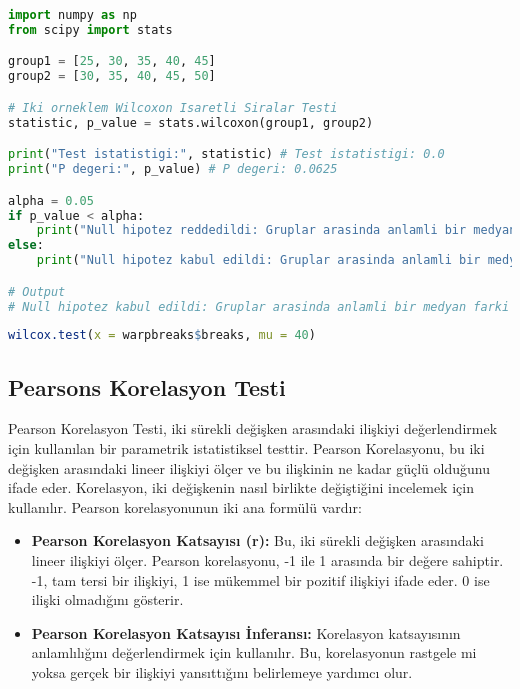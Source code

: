 \begin{lstlisting}[language=Python]
import numpy as np
from scipy import stats

group1 = [25, 30, 35, 40, 45]
group2 = [30, 35, 40, 45, 50]

# Iki orneklem Wilcoxon Isaretli Siralar Testi
statistic, p_value = stats.wilcoxon(group1, group2)

print("Test istatistigi:", statistic) # Test istatistigi: 0.0
print("P degeri:", p_value) # P degeri: 0.0625

alpha = 0.05
if p_value < alpha:
    print("Null hipotez reddedildi: Gruplar arasinda anlamli bir medyan farki vardir.")
else:
    print("Null hipotez kabul edildi: Gruplar arasinda anlamli bir medyan farki yoktur.")

# Output
# Null hipotez kabul edildi: Gruplar arasinda anlamli bir medyan farki yoktur.
\end{lstlisting}

\begin{lstlisting}[language=R]
wilcox.test(x = warpbreaks$breaks, mu = 40)
\end{lstlisting}

\newpage

\subsection{Pearsons Korelasyon Testi}
Pearson Korelasyon Testi, iki sürekli değişken arasındaki ilişkiyi değerlendirmek için kullanılan bir parametrik istatistiksel testtir. Pearson Korelasyonu, bu iki değişken arasındaki lineer ilişkiyi ölçer ve bu ilişkinin ne kadar güçlü olduğunu ifade eder. Korelasyon, iki değişkenin nasıl birlikte değiştiğini incelemek için kullanılır. Pearson korelasyonunun iki ana formülü vardır:

\begin{itemize}
    \item \textbf{Pearson Korelasyon Katsayısı (r):} Bu, iki sürekli değişken arasındaki lineer ilişkiyi ölçer. Pearson korelasyonu, -1 ile 1 arasında bir değere sahiptir. -1, tam tersi bir ilişkiyi, 1 ise mükemmel bir pozitif ilişkiyi ifade eder. 0 ise ilişki olmadığını gösterir.
    \item \textbf{Pearson Korelasyon Katsayısı İnferansı:} Korelasyon katsayısının anlamlılığını değerlendirmek için kullanılır. Bu, korelasyonun rastgele mi yoksa gerçek bir ilişkiyi yansıttığını belirlemeye yardımcı olur.
\end{itemize}

